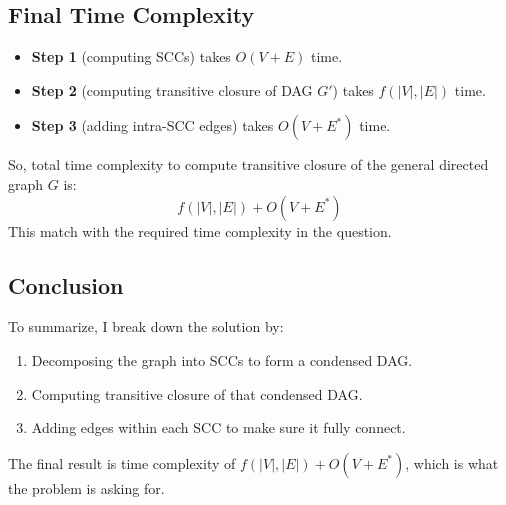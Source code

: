\documentclass[10pt,letter,notitlepage]{article}
\begin{document}
\begin{Answer}
\subsection*{Final Time Complexity}
\begin{itemize}
    \item \textbf{Step 1} (computing SCCs) takes $O(V + E)$ time.
    \item \textbf{Step 2} (computing transitive closure of DAG $G'$) takes $f(|V|, |E|)$ time.
    \item \textbf{Step 3} (adding intra-SCC edges) takes $O(V + E^*)$ time.
\end{itemize}

So, total time complexity to compute transitive closure of the general directed graph $G$ is:
\[
f(|V|, |E|) + O(V + E^*)
\]
This match with the required time complexity in the question.

\subsection*{Conclusion}
To summarize, I break down the solution by:
\begin{enumerate}
    \item Decomposing the graph into SCCs to form a condensed DAG.
    \item Computing transitive closure of that condensed DAG.
    \item Adding edges within each SCC to make sure it fully connect.
\end{enumerate}

The final result is time complexity of $f(|V|, |E|) + O(V + E^*)$, which is what the problem is asking for.


\end{Answer}
\end{document}
